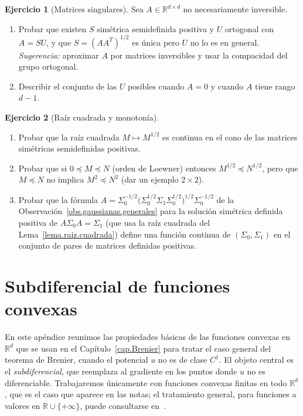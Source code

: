\documentclass[12pt, a4paper]{amsbook}
\newcommand{\R}{{\mathbb R}}
\theoremstyle{remark}
\theoremstyle{definition}
\newtheorem{ejercicio}{Ejercicio}[chapter]
\numberwithin{section}{chapter}
\numberwithin{subsection}{section}
\numberwithin{equation}{section}
\numberwithin{figure}{chapter}
\begin{document}
\begin{ejercicio}[Matrices singulares]\label{ejer.FP.singular}
Sea $A\in\R^{d\times d}$ no necesariamente inversible.
\begin{enumerate}[label=(\alph*)]
\item Probar que existen $S$ simétrica semidefinida positiva y $U$ ortogonal
con $A=SU$, y que $S=(AA^T)^{1/2}$ es única pero $U$ no lo es en general.
\emph{Sugerencia:} aproximar $A$ por matrices inversibles y usar la
compacidad del grupo ortogonal.
\item Describir el conjunto de las $U$ posibles cuando $A=0$ y cuando
$A$ tiene rango $d-1$.
\end{enumerate}
\end{ejercicio}

\begin{ejercicio}[Raíz cuadrada y monotonía]\label{ejer.FP.raiz}
\leavevmode
\begin{enumerate}[label=(\alph*)]
\item Probar que la raíz cuadrada $M\mapsto M^{1/2}$ es continua en el cono
de las matrices simétricas semidefinidas positivas.
\item Probar que si $0\preceq M\preceq N$ (orden de Loewner) entonces
$M^{1/2}\preceq N^{1/2}$, pero que $M\preceq N$ no implica $M^2\preceq N^2$
(dar un ejemplo $2\times2$).
\item Probar que la fórmula
$A=\Sigma_0^{-1/2}\bigl(\Sigma_0^{1/2}\Sigma_1\Sigma_0^{1/2}\bigr)^{1/2}\Sigma_0^{-1/2}$
de la Observación~\ref{obs.gaussianas.generales} para la solución simétrica
definida positiva de $A\Sigma_0A=\Sigma_1$ (que usa la raíz cuadrada del
Lema~\ref{lema.raiz.cuadrada}) define una función continua de
$(\Sigma_0,\Sigma_1)$ en el conjunto de pares de matrices definidas
positivas.
\end{enumerate}
\end{ejercicio}

\chapter{Subdiferencial de funciones convexas}\label{ap.subdiferencial}

En este apéndice reunimos las propiedades básicas de las funciones convexas
en $\R^d$ que se usan en el Capítulo~\ref{cap.Brenier} para tratar el caso
general del teorema de Brenier, cuando el potencial $u$ no es de clase $C^1$.
El objeto central es el \emph{subdiferencial}, que reemplaza al gradiente en
los puntos donde $u$ no es diferenciable. Trabajaremos únicamente con
funciones convexas finitas en todo $\R^d$, que es el caso que aparece en las
notas; el tratamiento general, para funciones a valores en $\R\cup\{+\infty\}$,
puede consultarse en~\cite{Rockafellar1970}.
\end{document}

